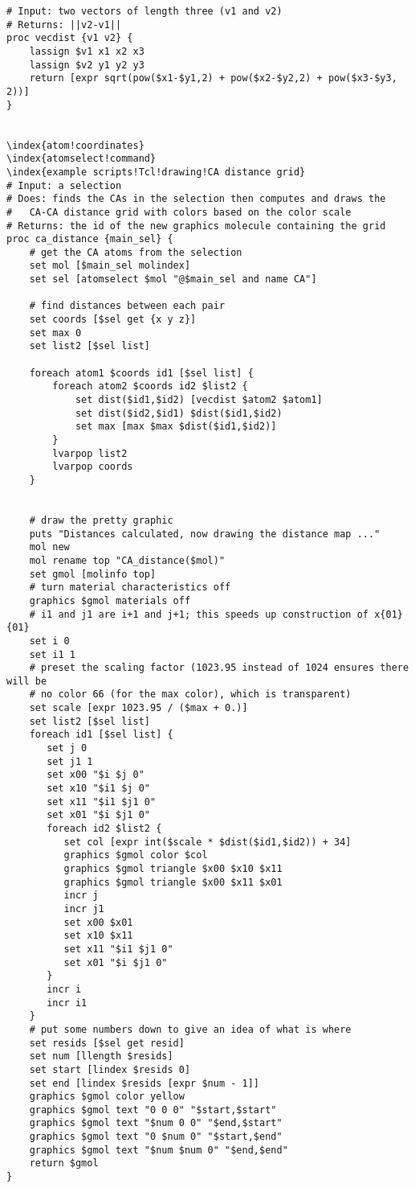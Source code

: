 \begin{verbatim}
# Input: two vectors of length three (v1 and v2)
# Returns: ||v2-v1||
proc vecdist {v1 v2} {
    lassign $v1 x1 x2 x3
    lassign $v2 y1 y2 y3
    return [expr sqrt(pow($x1-$y1,2) + pow($x2-$y2,2) + pow($x3-$y3, 2))]
}


\index{atom!coordinates}
\index{atomselect!command}
\index{example scripts!Tcl!drawing!CA distance grid}
# Input: a selection
# Does: finds the CAs in the selection then computes and draws the
#   CA-CA distance grid with colors based on the color scale
# Returns: the id of the new graphics molecule containing the grid
proc ca_distance {main_sel} {
    # get the CA atoms from the selection
    set mol [$main_sel molindex]
    set sel [atomselect $mol "@$main_sel and name CA"]

    # find distances between each pair
    set coords [$sel get {x y z}]
    set max 0
    set list2 [$sel list]

    foreach atom1 $coords id1 [$sel list] {
        foreach atom2 $coords id2 $list2 {
            set dist($id1,$id2) [vecdist $atom2 $atom1]
            set dist($id2,$id1) $dist($id1,$id2)
            set max [max $max $dist($id1,$id2)]
        }
        lvarpop list2
        lvarpop coords
    }


    # draw the pretty graphic
    puts "Distances calculated, now drawing the distance map ..."
    mol new
    mol rename top "CA_distance($mol)"
    set gmol [molinfo top]
    # turn material characteristics off
    graphics $gmol materials off
    # i1 and j1 are i+1 and j+1; this speeds up construction of x{01}{01}
    set i 0
    set i1 1
    # preset the scaling factor (1023.95 instead of 1024 ensures there will be
    # no color 66 (for the max color), which is transparent)
    set scale [expr 1023.95 / ($max + 0.)]
    set list2 [$sel list]
    foreach id1 [$sel list] {
       set j 0
       set j1 1
       set x00 "$i $j 0"
       set x10 "$i1 $j 0"
       set x11 "$i1 $j1 0"
       set x01 "$i $j1 0"
       foreach id2 $list2 {
          set col [expr int($scale * $dist($id1,$id2)) + 34]
          graphics $gmol color $col
          graphics $gmol triangle $x00 $x10 $x11
          graphics $gmol triangle $x00 $x11 $x01
          incr j
          incr j1
          set x00 $x01
          set x10 $x11
          set x11 "$i1 $j1 0"
          set x01 "$i $j1 0"
       }
       incr i
       incr i1
    }
    # put some numbers down to give an idea of what is where
    set resids [$sel get resid]
    set num [llength $resids]
    set start [lindex $resids 0]
    set end [lindex $resids [expr $num - 1]]
    graphics $gmol color yellow
    graphics $gmol text "0 0 0" "$start,$start"
    graphics $gmol text "$num 0 0" "$end,$start"
    graphics $gmol text "0 $num 0" "$start,$end"
    graphics $gmol text "$num $num 0" "$end,$end"
    return $gmol
}
\end{verbatim}

